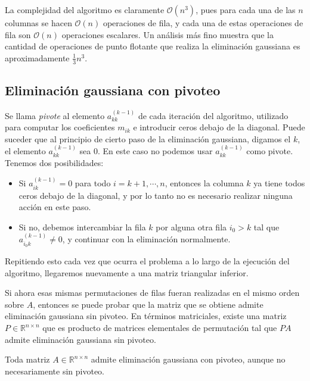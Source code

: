 La complejidad del algoritmo es claramente $\mathcal{O}(n^3)$, pues para cada una de las $n$ columnas se hacen $\mathcal{O}(n)$ operaciones de fila, y cada una de estas operaciones de fila son $\mathcal{O}(n)$ operaciones escalares. Un análisis más fino muestra que la cantidad de operaciones de punto flotante que realiza la eliminación gaussiana es aproximadamente $\frac{1}{3}n^3$.

\subsection{Eliminación gaussiana con pivoteo}

Se llama \textit{pivote} al elemento $a^{(k - 1)}_{kk}$ de cada iteración del algoritmo, utilizado para computar los coeficientes $m_{ik}$ e introducir ceros debajo de la diagonal. Puede suceder que al principio de cierto paso de la eliminación gaussiana, digamos el $k$, el elemento $a^{(k - 1)}_{kk}$ sea 0. En este caso no podemos usar $a^{(k-1)}_{kk}$ como pivote. Tenemos dos posibilidades:

\begin{itemize}
\item Si $a^{(k-1)}_{ik} = 0$ para todo $i = k + 1, \cdots, n$, entonces la columna $k$ ya tiene todos ceros debajo de la diagonal, y por lo tanto no es necesario realizar ninguna acción en este paso.
\item Si no, debemos intercambiar la fila $k$ por alguna otra fila $i_0 > k$ tal que $a^{(k-1)}_{i_0k} \neq 0$, y continuar con la eliminación normalmente.
\end{itemize}

Repitiendo esto cada vez que ocurra el problema a lo largo de la ejecución del algoritmo, llegaremos nuevamente a una matriz triangular inferior.

\begin{obs}{
\label{obs:sistemas1}
Si ahora esas mismas permutaciones de filas fueran realizadas en el mismo orden sobre $A$, entonces se puede probar que la matriz que se obtiene admite eliminación gaussiana sin pivoteo. En términos matriciales, existe una matriz $P \in \mathbb{R}^{n \times n}$ que es producto de matrices elementales de permutación tal que $PA$ admite eliminación gaussiana sin pivoteo.
}\end{obs}

\begin{obs}{
Toda matriz $A \in \mathbb{R}^{n \times n}$ admite eliminación gaussiana con pivoteo, aunque no necesariamente sin pivoteo.
}\end{obs}

